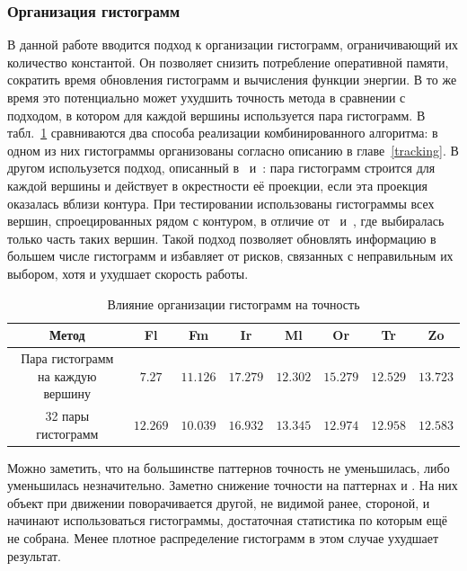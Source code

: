 \subsubsection{Организация гистограмм}

В данной работе вводится подход к организации гистограмм, ограничивающий их
количество константой.
Он позволяет снизить потребление оперативной памяти, сократить время
обновления гистограмм и вычисления функции энергии.
В то же время это потенциально может ухудшить точность метода в сравнении с
подходом, в котором для каждой вершины используется пара гистограмм.
В табл.~\ref{tab:full_hist} сравниваются два способа реализации
комбинированного алгоритма: в одном из них гистограммы организованы согласно
описанию в главе~\ref{tracking}.
В другом испольузется подход, описанный в~\cite{Tjaden2017}
и~\cite{Tjaden2018}: пара гистограмм строится для каждой вершины и действует в
окрестности её проекции, если эта проекция оказалась вблизи контура.
При тестировании использованы гистограммы всех вершин, спроецированных рядом
с контуром, в отличие от~\cite{Tjaden2017} и~\cite{Tjaden2018}, где выбиралась
только часть таких вершин.
Такой подход позволяет обновлять информацию в большем числе гистограмм и
избавляет от рисков, связанных с неправильным их выбором, хотя и ухудшает
скорость работы.

\begin{table}[h]
\caption{\label{tab:full_hist}Влияние организации гистограмм на точность}
\begin{center}
\begin{tabular}{|c|c|c|c|c|c|c|c|}
\hline
Метод & Fl & Fm & Ir & Ml & Or & Tr & Zo \\
\hline
Пара гистограмм на каждую вершину & $7.27$ & $\mathbf{11.126}$ &
$\mathbf{17.279}$ & $12.302$ & $\mathbf{15.279}$ & $12.529$ &
$\mathbf{13.723}$\\
\hline
32 пары гистограмм & $\mathbf{12.269}$ & $10.039$ & $16.932$ &
$\mathbf{13.345}$ & $12.974$ &
$\mathbf{12.958}$ & $12.583$ \\
\hline
\end{tabular}
\end{center}
\end{table}

Можно заметить, что на большинстве паттернов  точность не уменьшилась, либо
уменьшилась незначительно.
Заметно снижение точности на паттернах  и .
На них объект при движении поворачивается другой, не видимой ранее, стороной, и
начинают использоваться гистограммы, достаточная статистика по которым ещё не
собрана.
Менее плотное распределение гистограмм в этом случае ухудшает результат.


